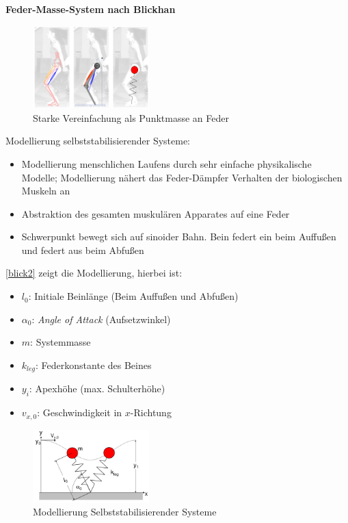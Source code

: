 \textbf{Feder-Masse-System nach Blickhan}\\
\begin{figure}[h!]
	\centering
	\includegraphics[width=0.4\textwidth]{figures/ch06_blickhan1.png}
	\caption{Starke Vereinfachung als Punktmasse an Feder}
	\label{blick}
\end{figure}
Modellierung selbststabilisierender Systeme:  
\begin{itemize}
\item Modellierung menschlichen Laufens durch sehr einfache physikalische Modelle; Modellierung nähert das Feder-Dämpfer Verhalten
der biologischen Muskeln an
\item Abstraktion des gesamten muskulären Apparates auf eine Feder
\item Schwerpunkt bewegt sich auf sinoider Bahn. Bein \glqq federt ein\grqq{} beim Auffußen und \glqq federt aus\grqq{} beim Abfußen
\end{itemize}
\autoref{blick2} zeigt die Modellierung, hierbei ist:
\begin{itemize}
	\item $l_0$: Initiale Beinlänge (Beim Auffußen und Abfußen)
	\item $\alpha_0$: \textit{Angle of Attack} (Aufsetzwinkel)
	\item $m$: Systemmasse
	\item $k_{leg}$: Federkonstante des Beines
	\item $y_i$: Apexhöhe (max. Schulterhöhe)
	\item $v_{x,0}$: Geschwindigkeit in $x$-Richtung
	\end{itemize}
\begin{figure}[h!]
	\centering
	\includegraphics[width=0.4\textwidth]{figures/ch06_blickhan2.png}
	\caption{Modellierung Selbststabilisierender Systeme}
	\label{blick2}
\end{figure}
